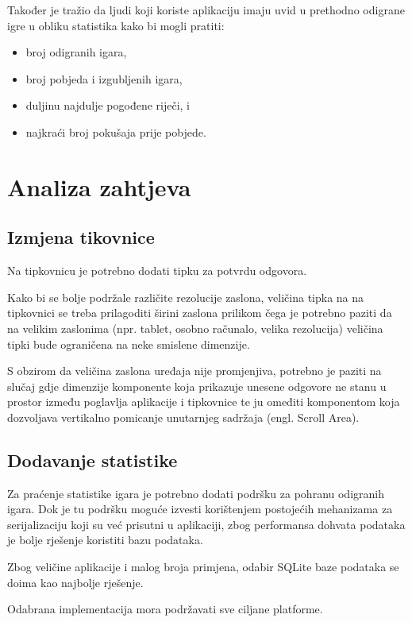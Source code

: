 \documentclass[12pt,a4paper]{report}
\begin{document}
Također je tražio da ljudi koji koriste aplikaciju imaju uvid u prethodno
odigrane igre u obliku statistika kako bi mogli pratiti:
\begin{itemize}
    \item broj odigranih igara,
    \item broj pobjeda i izgubljenih igara,
    \item duljinu najdulje pogođene riječi, i
    \item najkraći broj pokušaja prije pobjede.
\end{itemize}

\chapter{Analiza zahtjeva}

\section{Izmjena tikovnice}

Na tipkovnicu je potrebno dodati tipku za potvrdu odgovora.

Kako bi se bolje podržale različite rezolucije zaslona, veličina tipka na
na tipkovnici se treba prilagoditi širini zaslona prilikom čega je potrebno
paziti da na velikim zaslonima (npr. tablet, osobno računalo, velika rezolucija)
veličina tipki bude ograničena na neke smislene dimenzije.

S obzirom da veličina zaslona uređaja nije promjenjiva, potrebno je paziti na
slučaj gdje dimenzije komponente koja prikazuje unesene odgovore ne stanu u
prostor između poglavlja aplikacije i tipkovnice te ju omeđiti komponentom koja
dozvoljava vertikalno pomicanje unutarnjeg sadržaja (engl. Scroll Area).

\section{Dodavanje statistike}

Za praćenje statistike igara je potrebno dodati podršku za pohranu odigranih
igara. Dok je tu podršku moguće izvesti korištenjem postojećih mehanizama za
serijalizaciju koji su već prisutni u aplikaciji, zbog performansa dohvata
podataka je bolje rješenje koristiti bazu podataka.

Zbog veličine aplikacije i malog broja primjena, odabir SQLite baze podataka se
doima kao najbolje rješenje.

Odabrana implementacija mora podržavati sve ciljane platforme.
\end{document}
